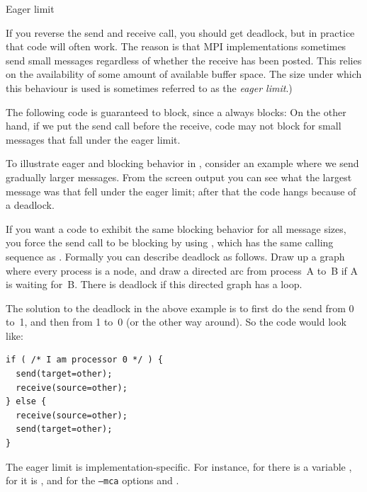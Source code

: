  {Eager limit}
\label{sec:eager-limit}

If you reverse the send and receive call, you should get deadlock,
but in practice that code will often work. The reason is that
MPI implementations sometimes send small messages regardless of whether
the receive has been posted. This relies on the availability of
some amount of available buffer space. The size under which this behaviour
is used is sometimes referred to as the \emph{eager limit}.)

The following code is guaranteed to block, since a 
always blocks:
On the other hand, if we put the send call before the receive,
code may not block for small messages
that fall under the eager limit.

To illustrate eager and blocking behavior in ,
consider an example where we send
gradually larger messages. From the screen output you can see what
the largest message was that fell under the eager limit; after that the code
hangs because of a deadlock.
%
%
%


If you want a code to exhibit the same blocking behavior for  all message sizes,
you force the send call to be blocking by using
, which has the same calling sequence as .
%
%
Formally you can describe deadlock as follows. Draw up a graph where
every process is a node, and draw a directed arc from process~A to~B if
A is waiting for~B. There is deadlock if this directed graph has a
loop.

The solution to the deadlock in the above example is to first do the
send from 0 to~1, and then from 1 to~0 (or the other way around). So
the code would look like:
\begin{lstlisting}
if ( /* I am processor 0 */ ) {
  send(target=other);
  receive(source=other);
} else {
  receive(source=other);
  send(target=other);
}
\end{lstlisting}

The eager limit is implementation-specific. For instance, for
 there is a variable
, for  it is
, and for  the
\texttt{--mca} options  and
.

